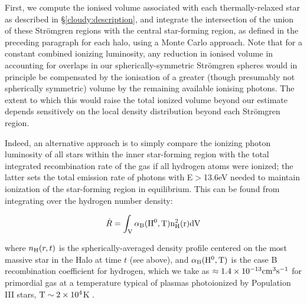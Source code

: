 \documentclass[graphics, twocolumn, usenatbib]{mn2e}
\begin{document}
First, we compute the ionised volume associated with each thermally-relaxed star as described in \S\ref{cloudy:description}, and integrate the intersection of the union of these Str{\"o}mgren regions with the central star-forming region, as defined in the preceding paragraph for each halo, using a Monte Carlo approach.
Note that for a constant combined ionizing luminosity, any reduction in ionised volume in accounting for overlaps in our spherically-symmetric Str{\"o}mgren spheres would in principle be compensated by the ionisation of a greater (though presumably not spherically symmetric) volume by the remaining available ionising photons. The extent to which this would raise the total ionized volume beyond our estimate depends sensitively on the local density distribution beyond each Str{\" o}mgren region.

Indeed, an alternative approach is to simply compare the ionizing photon luminosity of all stars within the inner star-forming region with the total integrated recombination rate of the gas if all hydrogen atoms were ionized; the latter sets the total emission rate of photons with E$>$13.6eV needed to maintain ionization of the star-forming region in equilibrium. This can be found from integrating over the hydrogen number density:

\begin{equation}
    \dot R = \int_{\rm{V}}\alpha_{\rm{B}}(\rm{H}^{0},T)n_{\rm{H}}^{2}(r)d\rm{V}
\end{equation}

\noindent where $n_{\rm{H}}(r, t)$ is the spherically-averaged density profile centered on the most massive star in the Halo at time $t$ (see above), and $\alpha_{\rm{B}}(\rm{H}^{0},T)$ is the case B recombination coefficient for hydrogen, which we take as $\approx1.4\times 10^{-13}\rm{cm}^{3}\rm{s}^{-1}$ for primordial gas at a temperature typical of plasmas photoionized by Population III stars, $\rm{T}\sim 2\times 10^{4}$K \citep{Osterbrock2006, Johnson2012}. 
\end{document}
